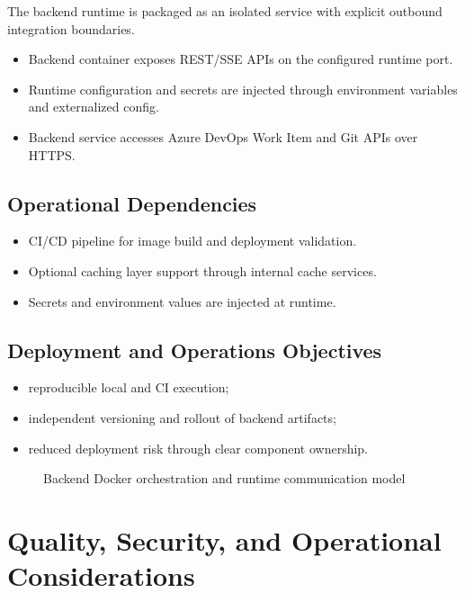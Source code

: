 The backend runtime is packaged as an isolated service with explicit outbound
integration boundaries.

\begin{itemize}
  \item Backend container exposes REST/SSE APIs on the configured runtime port.
  \item Runtime configuration and secrets are injected through environment
  variables and externalized config.
  \item Backend service accesses Azure DevOps Work Item and Git APIs over HTTPS.
\end{itemize}

\subsection{Operational Dependencies}

\begin{itemize}
  \item CI/CD pipeline for image build and deployment validation.
  \item Optional caching layer support through internal cache services.
  \item Secrets and environment values are injected at runtime.
\end{itemize}

\subsection{Deployment and Operations Objectives}

\begin{itemize}
  \item reproducible local and CI execution;
  \item independent versioning and rollout of backend artifacts;
  \item reduced deployment risk through clear component ownership.
\end{itemize}

\begin{figure}[H]
\centering
{}
\caption{Backend Docker orchestration and runtime communication model}
\label{fig:docker-runtime-orchestration}
\end{figure}

\section{Quality, Security, and Operational Considerations}

